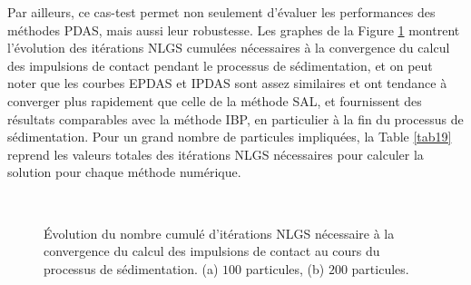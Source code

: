 Par ailleurs, ce cas-test permet non seulement d'évaluer les performances des méthodes PDAS, mais aussi leur robustesse. Les graphes de la Figure \ref{cumul_nlgs} montrent l'évolution des itérations NLGS cumulées nécessaires à la convergence du calcul des impulsions de contact pendant le processus de sédimentation, et on peut noter que les courbes EPDAS et IPDAS sont assez similaires et ont tendance à converger plus rapidement que celle de la méthode SAL, et fournissent des résultats comparables avec la méthode IBP, en particulier à la fin du processus de sédimentation. Pour un grand nombre de particules impliquées, la Table \ref{tab19} reprend les valeurs totales des itérations NLGS nécessaires pour calculer la solution pour chaque méthode numérique.\\

\begin{figure}[h!]
\hspace{\fill}
   \\
\caption{\label{cumul_nlgs}Évolution du nombre cumulé d'itérations NLGS nécessaire à la convergence du calcul des impulsions de contact au cours du processus de sédimentation. (a) $100$ particules, (b) $200$ particules.}
\end{figure}

